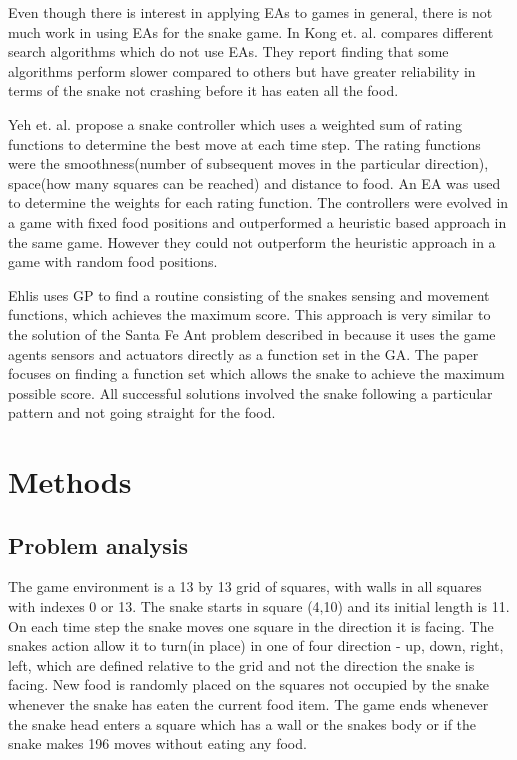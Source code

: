 \documentclass[12pt,a4paper]{article}
\begin{document}
	Even though there is interest in applying EAs to games in general, there is not much work in using EAs for the snake game. In \cite{kong_automated_nodate} Kong et. al. compares different search algorithms which do not use EAs. They report finding that some algorithms perform slower compared to others but have greater reliability in terms of the snake not crashing before it has eaten all the food. 
	
	Yeh et. al. \cite{yeh_snake_2016} propose a snake controller which uses a weighted sum of rating functions to determine the best move at each time step. The rating functions were the smoothness(number of subsequent moves in the particular direction), space(how many squares can be reached) and distance to food. An EA was used to determine the weights for each rating function. The controllers were evolved in a game with fixed food positions and outperformed a heuristic based approach in the same game. However they could not outperform the heuristic approach in a game with random food positions.
	
	Ehlis \cite{ehlis_application_2000} uses GP to find a routine consisting of the snakes sensing and movement functions, which achieves the maximum score. This approach is very similar to the solution of the Santa Fe Ant problem described in \cite{koza_genetic_1992} because it uses the game agents sensors and actuators directly as a function set in the GA. The paper focuses on finding a function set which allows the snake to achieve the maximum possible score. All successful solutions involved the snake following a particular pattern and not going straight for the food.
	

	\section{Methods} \label{methods}
	
	\subsection{Problem analysis}
	The game environment is a 13 by 13 grid of squares, with walls in all squares with indexes 0 or 13. The snake starts in square (4,10) and its initial length is 11. On each time step the snake moves one square in the direction it is facing. The snakes action allow it to turn(in place) in one of four direction - up, down, right, left, which are defined relative to the grid and not the direction the snake is facing. New food is randomly placed on the squares not occupied by the snake whenever the snake has eaten the current food item. The game ends whenever the snake head enters a square which has a wall or the snakes body or if the snake makes 196 moves without eating any food.  
	
\end{document}
